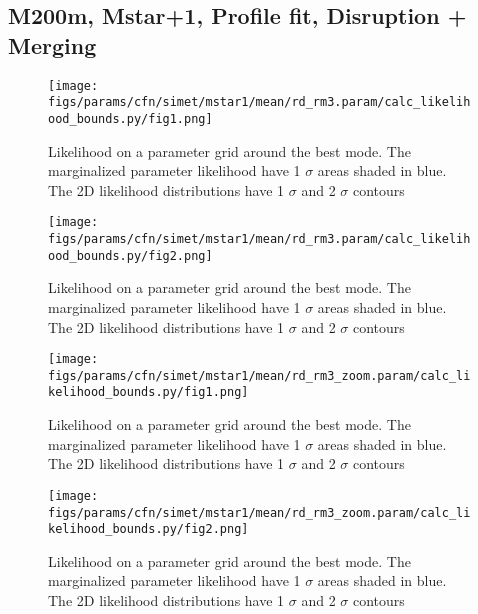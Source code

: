 \documentclass[twocolumn]{article}
\begin{document}
\subsection{M200m, Mstar+1, Profile fit, Disruption + Merging}
\begin{figure}[H]
  \center\texttt{[image: figs/params/cfn/simet/mstar1/mean/rd\_rm3.param/calc\_likelihood\_bounds.py/fig1.png]}
  \caption{Likelihood on a parameter grid around the best mode. The marginalized parameter likelihood have
    1 $\sigma$ areas shaded in blue. The 2D likelihood distributions have 1 $\sigma$  and 2 $\sigma$ contours}
  \label{fig:basic_rd:likelihood}
\end{figure}

\begin{figure}[H]
  \center\texttt{[image: figs/params/cfn/simet/mstar1/mean/rd\_rm3.param/calc\_likelihood\_bounds.py/fig2.png]}
  \caption{Likelihood on a parameter grid around the best mode. The marginalized parameter likelihood have
    1 $\sigma$ areas shaded in blue. The 2D likelihood distributions have 1 $\sigma$  and 2 $\sigma$ contours}
  \label{fig:basic_rd:likelihood}
\end{figure}

\begin{figure}[H]
  \center\texttt{[image: figs/params/cfn/simet/mstar1/mean/rd\_rm3\_zoom.param/calc\_likelihood\_bounds.py/fig1.png]}
  \caption{Likelihood on a parameter grid around the best mode. The marginalized parameter likelihood have
    1 $\sigma$ areas shaded in blue. The 2D likelihood distributions have 1 $\sigma$  and 2 $\sigma$ contours}
  \label{fig:basic_rd:likelihood}
\end{figure}

\begin{figure}[H]
  \center\texttt{[image: figs/params/cfn/simet/mstar1/mean/rd\_rm3\_zoom.param/calc\_likelihood\_bounds.py/fig2.png]}
  \caption{Likelihood on a parameter grid around the best mode. The marginalized parameter likelihood have
    1 $\sigma$ areas shaded in blue. The 2D likelihood distributions have 1 $\sigma$  and 2 $\sigma$ contours}
  \label{fig:basic_rd:likelihood}
\end{figure}
\end{document}
